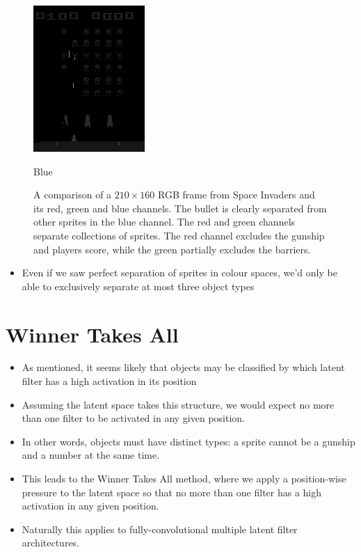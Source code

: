 \begin{figure}[h!]
\begin{multicols}{4}
    \includegraphics[scale=0.7]{figures/methods/separating_colour_spaces_b.png}
    \caption{Blue}
\end{multicols}
\caption{A comparison of a $210 \times 160$ RGB frame from Space Invaders and its red, green and blue channels. The bullet is clearly separated from other sprites in the blue channel. The red and green channels separate collections of sprites. The red channel excludes the gunship and players score, while the green partially excludes the barriers.}
\label{fig:separating_colour_spaces}
\end{figure}

\begin{itemize}

\item Even if we saw perfect separation of sprites in colour spaces, we'd only be able to exclusively separate at most three object types
\end{itemize}



%
%
%
%
%
\section{Winner Takes All}

\begin{itemize}
\item As mentioned, it seems likely that objects may be classified by which latent filter has a high activation in its position
\item Assuming the latent space takes this structure, we would expect no more than one filter to be activated in any given position.
\item In other words, objects must have distinct types: a sprite cannot be a gunship and a number at the same time.
\item This leads to the Winner Takes All method, where we apply a position-wise pressure to the latent space so that no more than one filter has a high activation in any given position.
\item Naturally this applies to fully-convolutional multiple latent filter architectures.
\end{itemize}



